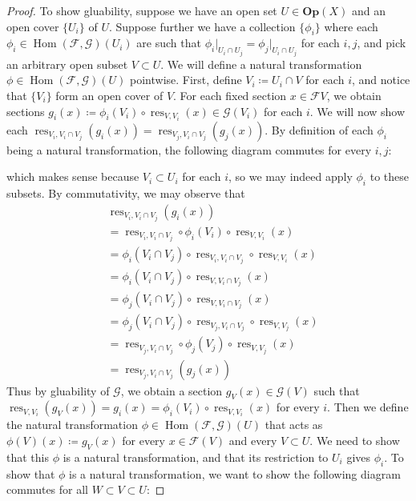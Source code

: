\documentclass{article}
\newcommand{\fF}{\mathscr{F}}
\newcommand{\fG}{\mathscr{G}}
\DeclareMathOperator{\res}{res}
\DeclareMathOperator{\Hom}{Hom}
\newcommand{\Op}{\mathbf{Op}} %
\begin{document}
\begin{proof}
    \indent To show gluability, suppose we have an open set $U\in \Op(X)$ and an open cover $\{U_i\}$ of $U$. Suppose further we have a collection $\{\phi_i\}$ where each $\phi_i\in \Hom(\fF,\fG)(U_i)$ are such that $\phi_i\vert_{U_i \cap U_j}=\phi_j\vert_{U_i\cap U_j}$ for each $i,j$, and pick an arbitrary open subset $V\subset U$. We will define a natural transformation $\phi\in \Hom(\fF,\fG)(U)$ pointwise. First, define $V_i\coloneqq U_i \cap V$ for each $i$, and notice that $\{V_i\}$ form an open cover of $V$. For each fixed section $x\in \fF V$, we obtain sections $g_i(x)\coloneqq \phi_i(V_i)\circ \res_{V,V_i}(x)\in \fG(V_i)$ for each $i$. We will now show each $\res_{V_i,V_i\cap V_j}(g_i(x))=\res_{V_j,V_i\cap V_j}(g_j(x))$. By definition of each $\phi_i$ being a natural transformation, the following diagram commutes for every $i,j$:
    \begin{center}
    \end{center}
    which makes sense because $V_i\subset U_i$ for each $i$, so we may indeed apply $\phi_i$ to these subsets. By commutativity, we may observe that
    \begin{align*}
        &\res_{V_i,V_i\cap V_j}(g_i(x))\\
        &=\res_{V_i,V_i\cap V_j}\circ \phi_i(V_i)\circ \res_{V,V_i}(x)\\
        &=\phi_i(V_i\cap V_j)\circ \res_{V_i,V_i\cap V_j}\circ \res_{V,V_i}(x)\\
        &=\phi_i(V_i\cap V_j)\circ \res_{V,V_i\cap V_j}(x)\\
        &=\phi_j(V_i\cap V_j)\circ \res_{V,V_i\cap V_j}(x)\\
        &=\phi_j(V_i\cap V_j)\circ \res_{V_j, V_i\cap V_j}\circ \res_{V,V_j}(x)\\
        &=\res_{V_j,V_i\cap V_j}\circ \phi_j(V_j)\circ \res_{V,V_j}(x)\\
        &=\res_{V_j,V_i \cap V_j}(g_j(x))
    \end{align*}
    Thus by gluability of $\fG$, we obtain a section $g_V(x)\in \fG(V)$ such that $\res_{V,V_i}(g_V(x))=g_i(x)=\phi_i(V_i)\circ \res_{V,V_i}(x)$ for every $i$. Then we define the natural transformation $\phi\in \Hom(\fF,\fG)(U)$ that acts as $\phi(V)(x)\coloneqq g_V(x)$ for every $x\in \fF(V)$ and every $V\subset U$. We need to show that this $\phi$ is a natural transformation, and that its restriction to $U_i$ gives $\phi_i$. To show that $\phi$ is a natural transformation, we want to show the following diagram commutes for all $W\subset V\subset U$:

\end{proof}
\end{document}

